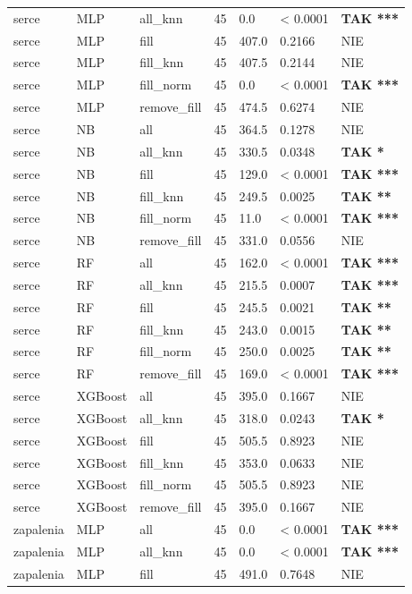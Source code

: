 \begin{table}[htbp]
\begin{tabular}{lllrlll}
serce & MLP & all_knn & 45 & 0.0 & < 0.0001 & \textbf{TAK ***} \\
serce & MLP & fill & 45 & 407.0 & 0.2166 & NIE \\
serce & MLP & fill_knn & 45 & 407.5 & 0.2144 & NIE \\
serce & MLP & fill_norm & 45 & 0.0 & < 0.0001 & \textbf{TAK ***} \\
serce & MLP & remove_fill & 45 & 474.5 & 0.6274 & NIE \\
serce & NB & all & 45 & 364.5 & 0.1278 & NIE \\
serce & NB & all_knn & 45 & 330.5 & 0.0348 & \textbf{TAK *} \\
serce & NB & fill & 45 & 129.0 & < 0.0001 & \textbf{TAK ***} \\
serce & NB & fill_knn & 45 & 249.5 & 0.0025 & \textbf{TAK **} \\
serce & NB & fill_norm & 45 & 11.0 & < 0.0001 & \textbf{TAK ***} \\
serce & NB & remove_fill & 45 & 331.0 & 0.0556 & NIE \\
serce & RF & all & 45 & 162.0 & < 0.0001 & \textbf{TAK ***} \\
serce & RF & all_knn & 45 & 215.5 & 0.0007 & \textbf{TAK ***} \\
serce & RF & fill & 45 & 245.5 & 0.0021 & \textbf{TAK **} \\
serce & RF & fill_knn & 45 & 243.0 & 0.0015 & \textbf{TAK **} \\
serce & RF & fill_norm & 45 & 250.0 & 0.0025 & \textbf{TAK **} \\
serce & RF & remove_fill & 45 & 169.0 & < 0.0001 & \textbf{TAK ***} \\
serce & XGBoost & all & 45 & 395.0 & 0.1667 & NIE \\
serce & XGBoost & all_knn & 45 & 318.0 & 0.0243 & \textbf{TAK *} \\
serce & XGBoost & fill & 45 & 505.5 & 0.8923 & NIE \\
serce & XGBoost & fill_knn & 45 & 353.0 & 0.0633 & NIE \\
serce & XGBoost & fill_norm & 45 & 505.5 & 0.8923 & NIE \\
serce & XGBoost & remove_fill & 45 & 395.0 & 0.1667 & NIE \\
zapalenia & MLP & all & 45 & 0.0 & < 0.0001 & \textbf{TAK ***} \\
zapalenia & MLP & all_knn & 45 & 0.0 & < 0.0001 & \textbf{TAK ***} \\
zapalenia & MLP & fill & 45 & 491.0 & 0.7648 & NIE \\

\end{tabular}
\end{table}
